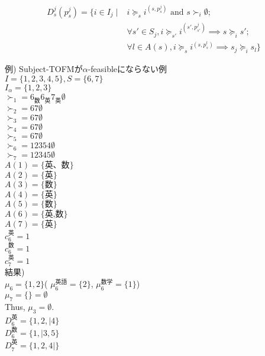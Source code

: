 \documentclass[a4j,10pt]{jsarticle}
\theoremstyle{definition}
\theoremstyle{remark}
\theoremstyle{plain}
\begin{document}
\begin{tcolorbox}[enhanced,breakable=true]
\begin{align*}
  D^j_s(p_s^j) = \{ i \in I_j \mid &i \succeq_s i^{(s,p^j_s)} \text{ and } s \succ_i \emptyset ;\\ &\forall s' \in S_j, i \succeq_{s'} i^{(s',p^j_{s'})} \implies s \succeq_i s' ;\\ &\forall l \in A(s), i \succeq_{s} i^{(s,p^l_{s})} \implies s_j \succeq_i s_l\}
\end{align*}

\bigbreak

例) Subject-TOFMが$\alpha$-feasibleにならない例\\
$I = \{1,2,3,4,5\}, S = \{6,7\}$\\
$I_\alpha = \{1,2,3\}$\\
$\succ_1 = 6_{\text{数}}6_{\text{英}}7_{\text{英}}\emptyset$\\
$\succ_2 = 67\emptyset$\\
$\succ_3 = 67\emptyset$\\
$\succ_4 = 67\emptyset$\\
$\succ_5 = 67\emptyset$\\
$\succ_6 = 12354\emptyset$\\
$\succ_7 = 12345\emptyset$\\

$A(1) = \{\text{英、数}\}$\\
$A(2) = \{\text{英}\}$\\
$A(3) = \{\text{数}\}$\\
$A(4) = \{\text{英}\}$\\
$A(5) = \{\text{数}\}$\\
$A(6) = \{\text{英,数}\}$\\
$A(7) = \{\text{英}\}$\\
$c_6^{\text{英}} = 1$\\
$c_6^{\text{数}} = 1$\\
$c_7^{\text{英}} = 1$\\

結果)\\
$\mu_6 = \{1,2\}$( $\mu_6^{\text{英語}} = \{2\}$, $\mu_6^{\text{数学}} = \{1\}$)\\
$\mu_7 = \{\} = \emptyset$\\


Thus, $\mu_3 = \emptyset$.\\

$D_6^{\text{英}} = \{1,2,|4\}$\\
$D_6^{\text{数}} = \{1,|3,5\}$\\
$D_7^{\text{英}} = \{1,2,4|\}$\\
\end{tcolorbox}
\end{document}
